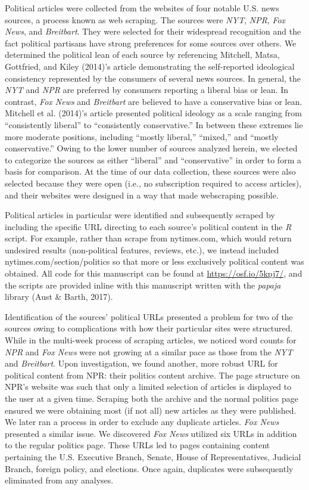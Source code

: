 \documentclass[
  man,floatsintext]{apa6}
\begin{document}
Political articles were collected from the websites of four notable U.S.
news sources, a process known as web scraping. The sources were \emph{NYT},
\emph{NPR}, \emph{Fox News}, and \emph{Breitbart}. They were selected for their
widespread recognition and the fact political partisans have strong
preferences for some sources over others. We determined the political
lean of each source by referencing Mitchell, Matsa, Gottfried, and Kiley (2014)'s article demonstrating
the self-reported ideological consistency represented by the consumers
of several news sources. In general, the \emph{NYT} and \emph{NPR} are preferred
by consumers reporting a liberal bias or lean. In contrast, \emph{Fox News}
and \emph{Breitbart} are believed to have a conservative bias or lean.
Mitchell et al. (2014)'s article presented political ideology as a scale ranging
from ``consistently liberal'' to ``consistently conservative.'' In between
these extremes lie more moderate positions, including ``mostly liberal,''
``mixed,'' and ``mostly conservative.'' Owing to the lower number of sources
analyzed herein, we elected to categorize the sources as either
``liberal'' and ``conservative'' in order to form a basis for comparison. At
the time of our data collection, these sources were also selected
because they were open (i.e., no subscription required to access
articles), and their websites were designed in a way that made
webscraping possible.

Political articles in particular were identified and subsequently
scraped by including the specific URL directing to each source's
political content in the \emph{R} script. For example, rather than scrape
from nytimes.com, which would return undesired results (non-political
features, reviews, etc.), we instead included
nytimes.com/section/politics so that more or less exclusively political
content was obtained. All code for this manuscript can be found at
\url{https://osf.io/5kpj7/}, and the scripts are provided inline with this
manuscript written with the \emph{papaja} library (Aust \& Barth, 2017).

Identification of the sources' political URLs presented a problem for
two of the sources owing to complications with how their particular
sites were structured. While in the multi-week process of scraping
articles, we noticed word counts for \emph{NPR} and \emph{Fox News} were not
growing at a similar pace as those from the \emph{NYT} and \emph{Breitbart}. Upon
investigation, we found another, more robust URL for political content
from NPR: their politics content archive. The page structure on NPR's
website was such that only a limited selection of articles is displayed
to the user at a given time. Scraping both the archive and the normal
politics page ensured we were obtaining most (if not all) new articles
as they were published. We later ran a process in order to exclude any
duplicate articles. \emph{Fox News} presented a similar issue. We discovered
\emph{Fox News} utilized six URLs in addition to the regular politics page.
These URLs led to pages containing content pertaining the U.S. Executive
Branch, Senate, House of Representatives, Judicial Branch, foreign
policy, and elections. Once again, duplicates were subsequently
eliminated from any analyses.
\end{document}

